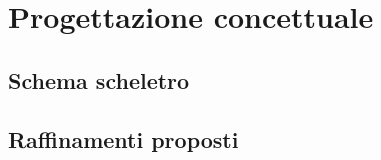 \documentclass[a4paper,12pt]{report}
\begin{document}





\newpage
\chapter{Progettazione concettuale}
\section{Schema scheletro}
\section{Raffinamenti proposti}
\end{document}
